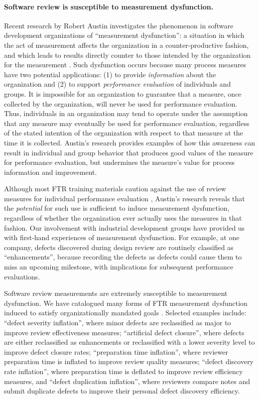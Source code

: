 \paragraph{Software review is susceptible to measurement dysfunction.} 

Recent research by Robert Austin investigates the phenomenon in software
development organizations of ``measurement dysfunction'': a situation in
which the act of measurement affects the organization in a
counter-productive fashion, and which leads to results directly counter to
those intended by the organization for the measurement \cite{Austin96}.
Such dysfunction occurs because many process measures have two potential
applications: (1) to provide {\em information} about the organization and
(2) to support {\em performance evaluation} of individuals and groups.
It is impossible for an organization to guarantee that a
measure, once collected by the organization, will never be used for
performance evaluation. Thus, individuals in an organization may tend to
operate under the assumption that any measure may eventually be used for
performance evaluation, regardless of the stated intention of the
organization with respect to that measure at the time it is collected.
Austin's research provides examples of how this awareness can result in individual
and group behavior that produces good values of the measure for performance
evaluation, but undermines the measure's value for process information and
improvement.

Although most FTR training materials caution against the use of review
measures for individual performance evaluation
\cite{Gilb93,Freedman90,Strauss94}, Austin's research reveals that the {\em
  potential} for such use is sufficient to induce measurement dysfunction,
regardless of whether the organization ever actually uses the measures in
that fashion.  Our involvement with industrial development groups have
provided us with first-hand experiences of measurement dysfunction. For
example, at one company, defects discovered during design review are
routinely classified as ``enhancements'', because recording 
the defects as defects could cause them to miss an upcoming milestone,
with implications for subsequent performance evaluations.

Software review measurements are extremely susceptible to measurement
dysfunction.  We have catalogued many forms of FTR measurement dysfunction
induced to satisfy organizationally mandated goals \cite{csdl-96-16}.
Selected examples include: ``defect severity inflation'', where minor
defects are reclassified as major to improve review effectiveness measures;
``artificial defect closure'', where defects are either reclassified as
enhancements or reclassified with a lower severity level to improve defect
closure rates; ``preparation time inflation'', where reviewer preparation
time is inflated to improve review quality measures; ``defect discovery
rate inflation'', where preparation time is deflated to improve review
efficiency measures, and ``defect duplication inflation'', where reviewers
compare notes and submit duplicate defects to improve their personal defect
discovery efficiency.



